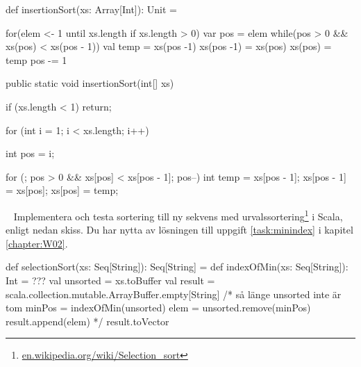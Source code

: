 \SOLUTION


\TaskSolved \what


\SubtaskSolved

\begin{Code}
def insertionSort(xs: Array[Int]): Unit = {

  for(elem <- 1 until xs.length if xs.length > 0){
    var pos = elem
    while(pos > 0 && xs(pos) < xs(pos - 1)){
      val temp = xs(pos -1)
      xs(pos -1) = xs(pos)
      xs(pos) = temp
      pos -= 1
    }
  }
}
\end{Code}

\SubtaskSolved

\begin{Code}[language=Java]
public static void insertionSort(int[] xs) {

    if (xs.length < 1)
        return;

    for (int i = 1; i < xs.length; i++) {
        int pos = i;

        for (; pos > 0 && xs[pos] < xs[pos - 1]; pos--) {
            int temp = xs[pos - 1];
            xs[pos - 1] = xs[pos];
            xs[pos] = temp;
        }
    }
}
\end{Code}



\QUESTEND



\clearpage

\AdvancedTasks



\QUESTBEGIN

\Task  \what~ Implementera och testa sortering till ny sekvens med urvalssortering\footnote{\href{https://en.wikipedia.org/wiki/Selection_sort}{en.wikipedia.org/wiki/Selection\_sort}} i Scala, enligt nedan skiss.  Du har nytta av lösningen till uppgift \ref{task:minindex} i kapitel \ref{chapter:W02}.
\begin{Code}
def selectionSort(xs: Seq[String]): Seq[String] = {
  def indexOfMin(xs: Seq[String]): Int = ???
  val unsorted = xs.toBuffer
  val result = scala.collection.mutable.ArrayBuffer.empty[String]
  /*
  så länge unsorted inte är tom {
    minPos = indexOfMin(unsorted)
    elem   = unsorted.remove(minPos)
    result.append(elem)
  }
  */
  result.toVector
}
\end{Code}



\SOLUTION


\TaskSolved \what


